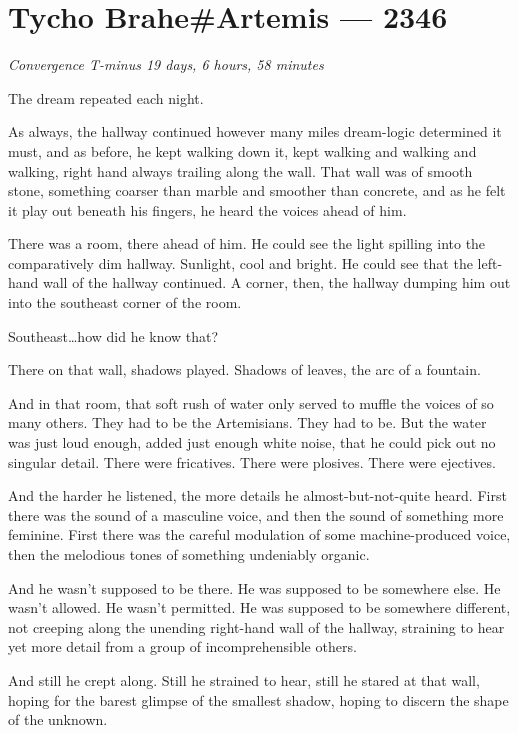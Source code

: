 \hypertarget{tycho-braheartemis-2346}{%
\chapter{Tycho Brahe\#Artemis — 2346}\label{tycho-braheartemis-2346}}

\begin{center}
\emph{Convergence T-minus 19 days, 6 hours, 58 minutes}
\end{center}

\noindent The dream repeated each night.

As always, the hallway continued however many miles dream-logic determined it must, and as before, he kept walking down it, kept walking and walking and walking, right hand always trailing along the wall. That wall was of smooth stone, something coarser than marble and smoother than concrete, and as he felt it play out beneath his fingers, he heard the voices ahead of him.

There was a room, there ahead of him. He could see the light spilling into the comparatively dim hallway. Sunlight, cool and bright. He could see that the left-hand wall of the hallway continued. A corner, then, the hallway dumping him out into the southeast corner of the room.

Southeast\ldots how did he know that?

There on that wall, shadows played. Shadows of leaves, the arc of a fountain.

And in that room, that soft rush of water only served to muffle the voices of so many others. They had to be the Artemisians. They had to be. But the water was just loud enough, added just enough white noise, that he could pick out no singular detail. There were fricatives. There were plosives. There were ejectives.

And the harder he listened, the more details he almost-but-not-quite heard. First there was the sound of a masculine voice, and then the sound of something more feminine. First there was the careful modulation of some machine-produced voice, then the melodious tones of something undeniably organic.

And he wasn't supposed to be there. He was supposed to be somewhere else. He wasn't allowed. He wasn't permitted. He was supposed to be somewhere different, not creeping along the unending right-hand wall of the hallway, straining to hear yet more detail from a group of incomprehensible others.

And still he crept along. Still he strained to hear, still he stared at that wall, hoping for the barest glimpse of the smallest shadow, hoping to discern the shape of the unknown.

